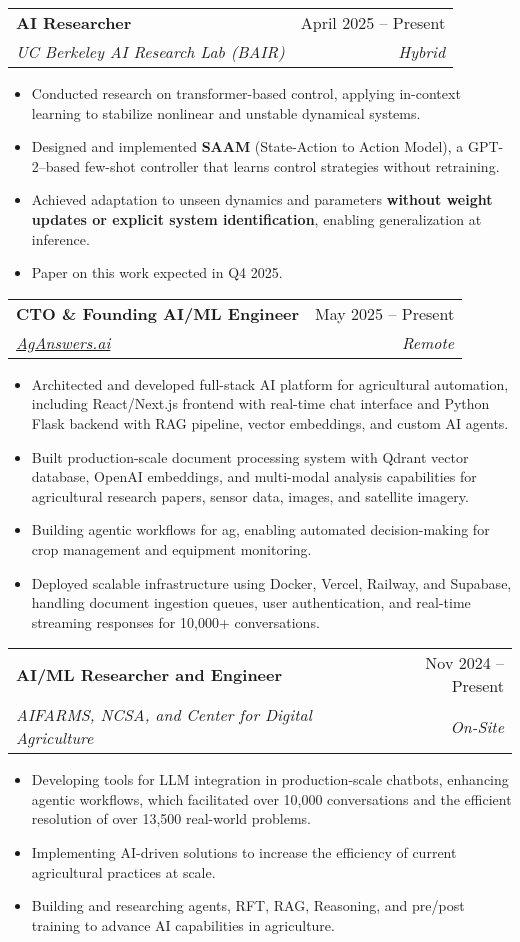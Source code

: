 \documentclass[letterpaper,10.99999999999999pt]{article}
\makeatletter
\newcommand{\resumeItem}[1]{
  \item\small{
    {#1 \vspace{-1pt}}
  }
}
\newcommand{\resumeSubheading}[4]{
  \vspace{-1pt}\item
    \begin{tabular*}{0.97\textwidth}[t]{l@{\extracolsep{\fill}}r}
      \textbf{#1} & #2 \\
      \textit{\small#3} & \textit{\small #4} \\
    \end{tabular*}\vspace{-6pt}
}
\newcommand{\resumeItemListStart}{\begin{itemize}}
\newcommand{\resumeItemListEnd}{\end{itemize}\vspace{-5pt}}
\makeatother
\begin{document}
  \resumeSubheading
    {AI Researcher}{April 2025 – Present}
    {UC Berkeley AI Research Lab (BAIR)}{Hybrid}
    \resumeItemListStart
      \resumeItem{Conducted research on transformer-based control, applying in-context learning to stabilize nonlinear and unstable dynamical systems.}
      \resumeItem{Designed and implemented \textbf{SAAM} (State-Action to Action Model), a GPT-2–based few-shot controller that learns control strategies without retraining.}
      \resumeItem{Achieved adaptation to unseen dynamics and parameters \textbf{without weight updates or explicit system identification}, enabling generalization at inference.}
      \resumeItem{Paper on this work expected in Q4 2025.}
    \resumeItemListEnd


  \resumeSubheading
      {CTO \& Founding AI/ML Engineer}{May 2025 – Present}
      {\href{https://aganswers.ai/}{AgAnswers.ai}}{Remote}
      \resumeItemListStart
        \resumeItem{Architected and developed full-stack AI platform for agricultural automation, including React/Next.js frontend with real-time chat interface and Python Flask backend with RAG pipeline, vector embeddings, and custom AI agents.}
        \resumeItem{Built production-scale document processing system with Qdrant vector database, OpenAI embeddings, and multi-modal analysis capabilities for agricultural research papers, sensor data, images, and satellite imagery.}
        \resumeItem{Building agentic workflows for ag, enabling automated decision-making for crop management and equipment monitoring.}
        \resumeItem{Deployed scalable infrastructure using Docker, Vercel, Railway, and Supabase, handling document ingestion queues, user authentication, and real-time streaming responses for 10,000+ conversations.}
      \resumeItemListEnd

  \resumeSubheading
      {AI/ML Researcher and Engineer}{Nov 2024 – Present}
      {AIFARMS, NCSA, and Center for Digital Agriculture}{On-Site}
      \resumeItemListStart
        \resumeItem{Developing tools for LLM integration in production-scale chatbots, enhancing agentic workflows, which facilitated over 10,000 conversations and the efficient resolution of over 13,500 real-world problems.}
        \resumeItem{Implementing AI-driven solutions to increase the efficiency of current agricultural practices at scale.}
        \resumeItem{Building and researching agents, RFT, RAG, Reasoning, and pre/post training to advance AI capabilities in agriculture.}
      \resumeItemListEnd
\end{document}
